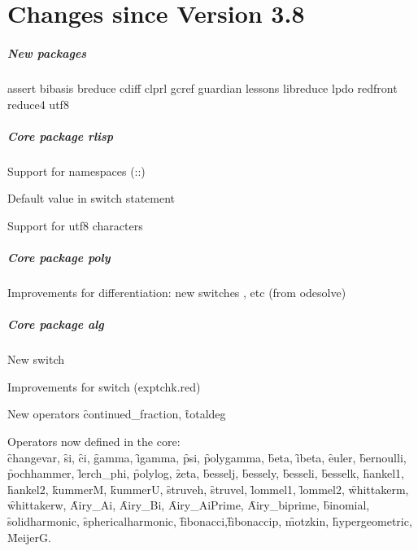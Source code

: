 \chapter{Changes since Version 3.8}

\paragraph*{New packages}

assert
bibasis
breduce
cdiff
clprl
gcref
guardian
lessons
libreduce
lpdo
redfront
reduce4
utf8

\paragraph*{Core package rlisp}

Support for namespaces (::)

Default value in switch statement

Support for utf8 characters

\paragraph*{Core package poly}

Improvements for differentiation: new switches ,  etc
(from odesolve)

\paragraph*{Core package alg}

New switch 

Improvements for switch  (exptchk.red)

New operators \f{continued\_fraction}, \f{totaldeg}

Operators now defined in the \REDUCE core:\\
\f{changevar},
\f{si}, \f{ci}, \f{gamma}, \f{igamma}, \f{psi}, \f{polygamma}, \f{beta}, \f{ibeta},
\f{euler},
\f{bernoulli}, \f{pochhammer}, \f{lerch\_phi}, \f{polylog}, \f{zeta}, 
\f{besselj},
\f{bessely},
\f{besseli},
\f{besselk},
\f{hankel1},
\f{hankel2},
\f{kummerM},
\f{kummerU},
\f{struveh},
\f{struvel},
\f{lommel1},
\f{lommel2},
\f{whittakerm},
\f{whittakerw},
\f{Airy\_Ai},
\f{Airy\_Bi},
\f{Airy\_AiPrime},
\f{Airy\_biprime},
\f{binomial},
\f{solidharmonic},
\f{sphericalharmonic},
\f{fibonacci},\f{fibonaccip},
\f{motzkin},
\f{hypergeometric}, \f{MeijerG}.

